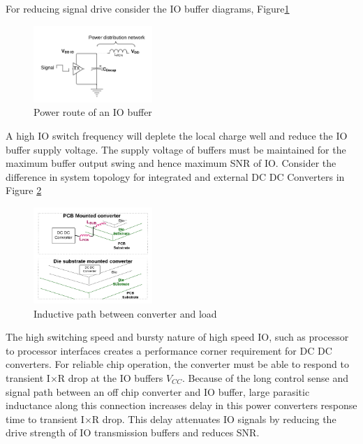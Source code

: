 \documentclass[letterpaper,twocolumn,10pt]{article}
\begin{document}
For reducing signal drive consider the IO buffer diagrams, Figure\ref{IOBuf}\\ %
\begin{figure}[here]
\includegraphics[width=0.4\textwidth]{IOBufferDroop}
\caption{Power route of an IO buffer}
\label{IOBuf}
\end{figure}
A high IO switch frequency will deplete the local charge well and reduce the IO buffer supply voltage. 
The supply voltage of buffers must be maintained for the maximum buffer output swing and hence maximum SNR of IO. Consider the difference in system topology for integrated and external DC DC Converters in Figure \ref{DroopTop}\\
\begin{figure}[here]
\includegraphics[width=0.4\textwidth]{DroopResponseLatency}
\caption{Inductive path between converter and load}
\label{DroopTop}
\end{figure}
The high switching speed and bursty nature of high speed IO, such as processor to processor interfaces creates a performance corner requirement for DC DC converters. For reliable chip operation, the converter must be able to respond to transient I$\times$R drop at the IO buffers $V_{CC}$. Because of the long control sense and signal path between an off chip converter and IO buffer, large parasitic inductance along this connection increases delay in this power converters response time to transient I$\times$R drop. This delay attenuates IO signals by reducing the drive strength of IO transmission buffers and reduces SNR.\\
\end{document}
